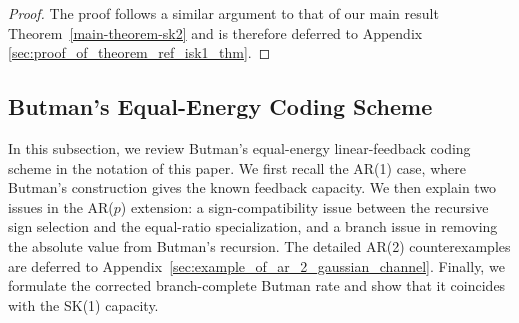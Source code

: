 \documentclass[12pt]{article}
\begin{document}
\begin{proof}
The proof follows a similar argument to that of our main result Theorem~\ref{main-theorem-sk2} and is therefore deferred to Appendix \ref{sec:proof_of_theorem_ref_isk1_thm}.
\end{proof}



\subsection{Butman's Equal-Energy Coding Scheme}\label{subsec:relation_to_butman}
In this subsection, we review Butman's equal-energy linear-feedback coding scheme in the notation of this paper. We first recall the AR(1) case, where Butman's construction gives the known feedback capacity. We then explain two issues in the AR($p$) extension: a sign-compatibility issue between the recursive sign selection and the equal-ratio specialization, and a branch issue in removing the absolute value from Butman's recursion. The detailed AR(2) counterexamples are deferred to Appendix~\ref{sec:example_of_ar_2_gaussian_channel}. Finally, we formulate the corrected branch-complete Butman rate and show that it coincides with the SK(1) capacity.
\end{document}
